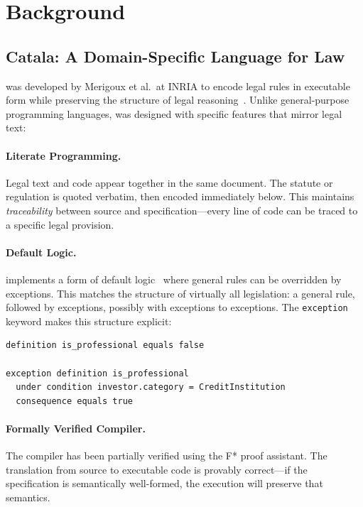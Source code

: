 
\section{Background}
\label{sec:background}

\subsection{Catala: A Domain-Specific Language for Law}
\label{sec:catala}

\catala{} was developed by Merigoux et al.\ at INRIA to encode legal rules in executable form while preserving the structure of legal reasoning~\cite{merigoux2021catala}. Unlike general-purpose programming languages, \catala{} was designed with specific features that mirror legal text:

\paragraph{Literate Programming.} Legal text and code appear together in the same document. The statute or regulation is quoted verbatim, then encoded immediately below. This maintains \textit{traceability} between source and specification---every line of code can be traced to a specific legal provision.

\paragraph{Default Logic.} \catala{} implements a form of default logic~\cite{reiter1980logic} where general rules can be overridden by exceptions. This matches the structure of virtually all legislation: a general rule, followed by exceptions, possibly with exceptions to exceptions. The \texttt{exception} keyword makes this structure explicit:

\begin{lstlisting}
definition is_professional equals false

exception definition is_professional
  under condition investor.category = CreditInstitution
  consequence equals true
\end{lstlisting}

\paragraph{Formally Verified Compiler.} The \catala{} compiler has been partially verified using the F* proof assistant. The translation from \catala{} source to executable code is provably correct---if the specification is semantically well-formed, the execution will preserve that semantics.

